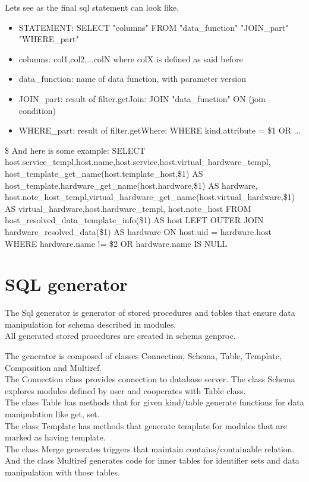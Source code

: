 \documentclass[deska]{subfiles}
\begin{document}
Lets see as the final sql statement can look like.
\begin{itemize}
\item{STATEMENT}: SELECT "columns" FROM "data\_function" "JOIN\_part" "WHERE\_part"
\item{columns}: col1,col2,...colN where colX is defined as said before
\item{data\_function}: name of data function, with parameter version
\item{JOIN\_part}: result of filter.getJoin: JOIN "data\_function" ON (join condition)
\item{WHERE\_part}: result of filter.getWhere: WHERE kind.attribute = \$1 OR ...
\end{itemize}\$
And here is some example:
SELECT host.service\_templ,host.name,host.service,host.virtual\_hardware\_templ,
host\_template\_get\_name(host.template\_host,\$1) AS host\_template,hardware\_get\_name(host.hardware,\$1) AS hardware,
host.note\_host\_templ,virtual\_hardware\_get\_name(host.virtual\_hardware,\$1) AS virtual\_hardware,host.hardware\_templ,
host.note\_host FROM host\_resolved\_data\_template\_info(\$1) AS host
LEFT OUTER JOIN hardware\_resolved\_data(\$1) AS hardware ON host.uid = hardware.host
WHERE hardware.name != \$2 OR hardware.name IS NULL 

\section{SQL generator}
The Sql generator is generator of stored procedures and tables that ensure data manipulation for schema described in modules.\\
All generated stored procedures are created in schema genproc.

The generator is composed of classes Connection, Schema, Table, Template, Composition and Multiref.\\
The Connection class provides connection to database server.
The class Schema explores modules defined by user and cooperates with Table class.\\
The class Table has methods that for given kind/table generate functions for data manipulation like get, set.\\
The class Template has methods that generate template for modules that are marked as having template.\\
The class Merge generates triggers that maintain contains/containable relation.\\
And the class Multiref generates code for inner tables for identifier sets and data manipulation with those tables.\\
\end{document}
